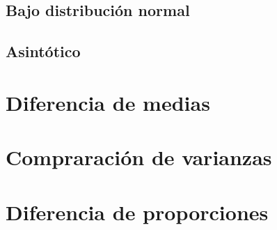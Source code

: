 \documentclass[
]{book}
\begin{document}
\hypertarget{bajo-distribuciuxf3n-normal}{%
\subsection{Bajo distribución normal}\label{bajo-distribuciuxf3n-normal}}

\hypertarget{asintuxf3tico}{%
\subsection{Asintótico}\label{asintuxf3tico}}

\hypertarget{diferencia-de-medias-1}{%
\section{Diferencia de medias}\label{diferencia-de-medias-1}}

\hypertarget{compraraciuxf3n-de-varianzas}{%
\section{Compraración de varianzas}\label{compraraciuxf3n-de-varianzas}}

\hypertarget{diferencia-de-proporciones-1}{%
\section{Diferencia de proporciones}\label{diferencia-de-proporciones-1}}

  
\end{document}
